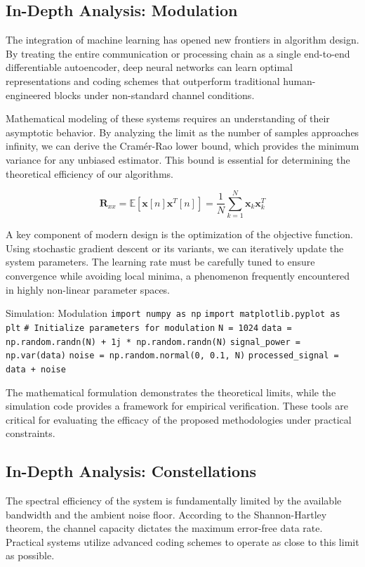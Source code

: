 \subsection{In-Depth Analysis: Modulation}
The integration of machine learning has opened new frontiers in algorithm design. By treating the entire communication or processing chain as a single end-to-end differentiable autoencoder, deep neural networks can learn optimal representations and coding schemes that outperform traditional human-engineered blocks under non-standard channel conditions.

Mathematical modeling of these systems requires an understanding of their asymptotic behavior. By analyzing the limit as the number of samples approaches infinity, we can derive the Cramér-Rao lower bound, which provides the minimum variance for any unbiased estimator. This bound is essential for determining the theoretical efficiency of our algorithms.

\begin{equation}
    \mathbf{R}_{xx} = \mathbb{E}[\mathbf{x}[n]\mathbf{x}^T[n]] = \frac{1}{N} \sum_{k=1}^{N} \mathbf{x}_k \mathbf{x}_k^T
\end{equation}

A key component of modern design is the optimization of the objective function. Using stochastic gradient descent or its variants, we can iteratively update the system parameters. The learning rate must be carefully tuned to ensure convergence while avoiding local minima, a phenomenon frequently encountered in highly non-linear parameter spaces.

\begin{pythonbox}{Simulation: Modulation}
\texttt{import numpy as np}
\texttt{import matplotlib.pyplot as plt}
\texttt{}
\texttt{\# Initialize parameters for modulation}
\texttt{N = 1024}
\texttt{data = np.random.randn(N) + 1j * np.random.randn(N)}
\texttt{signal\_power = np.var(data)}
\texttt{noise = np.random.normal(0, 0.1, N)}
\texttt{processed\_signal = data + noise}
\end{pythonbox}

\vspace{0.5cm}
The mathematical formulation demonstrates the theoretical limits, while the simulation code provides a framework for empirical verification. These tools are critical for evaluating the efficacy of the proposed methodologies under practical constraints.


\subsection{In-Depth Analysis: Constellations}
The spectral efficiency of the system is fundamentally limited by the available bandwidth and the ambient noise floor. According to the Shannon-Hartley theorem, the channel capacity dictates the maximum error-free data rate. Practical systems utilize advanced coding schemes to operate as close to this limit as possible.

